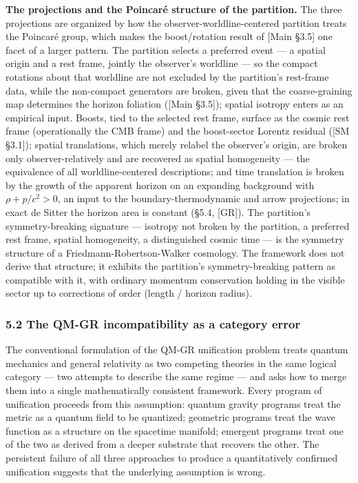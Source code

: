 \documentclass[
]{article}
\begin{document}
\textbf{The projections and the Poincaré structure of the partition.}
The three projections are organized by how the
observer-worldline-centered partition treats the Poincaré group, which
makes the boost/rotation result of {[}Main §3.5{]} one facet of a larger
pattern. The partition selects a preferred event --- a spatial origin
and a rest frame, jointly the observer's worldline --- so the compact
rotations about that worldline are not excluded by the partition's
rest-frame data, while the non-compact generators are broken, given that
the coarse-graining map determines the horizon foliation ({[}Main
§3.5{]}); spatial isotropy enters as an empirical input. Boosts, tied to
the selected rest frame, surface as the cosmic rest frame (operationally
the CMB frame) and the boost-sector Lorentz residual ({[}SM §3.1{]});
spatial translations, which merely relabel the observer's origin, are
broken only observer-relatively and are recovered as spatial homogeneity
--- the equivalence of all worldline-centered descriptions; and time
translation is broken by the growth of the apparent horizon on an
expanding background with \(\rho + p/c^2 > 0\), an input to the
boundary-thermodynamic and arrow projections; in exact de Sitter the
horizon area is constant (§5.4, {[}GR{]}). The partition's
symmetry-breaking signature --- isotropy not broken by the partition, a
preferred rest frame, spatial homogeneity, a distinguished cosmic time
--- is the symmetry structure of a Friedmann-Robertson-Walker cosmology.
The framework does not derive that structure; it exhibits the
partition's symmetry-breaking pattern as compatible with it, with
ordinary momentum conservation holding in the visible sector up to
corrections of order (length / horizon radius).

\hypertarget{the-qm-gr-incompatibility-as-a-category-error}{%
\subsubsection{5.2 The QM-GR incompatibility as a category
error}\label{the-qm-gr-incompatibility-as-a-category-error}}

The conventional formulation of the QM-GR unification problem treats
quantum mechanics and general relativity as two competing theories in
the same logical category --- two attempts to describe the same regime
--- and asks how to merge them into a single mathematically consistent
framework. Every program of unification proceeds from this assumption:
quantum gravity programs treat the metric as a quantum field to be
quantized; geometric programs treat the wave function as a structure on
the spacetime manifold; emergent programs treat one of the two as
derived from a deeper substrate that recovers the other. The persistent
failure of all three approaches to produce a quantitatively confirmed
unification suggests that the underlying assumption is wrong.
\end{document}
